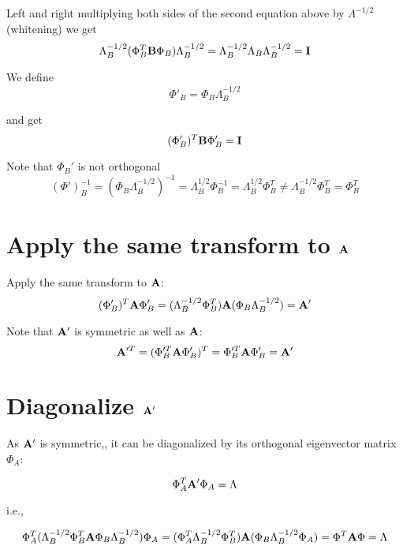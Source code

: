 \documentclass[11pt,letterpaper]{article}
\begin{document}
Left and right multiplying both sides of the second equation above by  $\Lambda^{-1/2}$ (whitening) we get 
\begin{equation}
\Lambda^{-1/2}_B (\Phi_B^T{\bf B}\Phi_B)\Lambda_B^{-1/2}      =    \Lambda^{-1/2}_B    \Lambda_B\Lambda^{-1/2}_B={\bf I}
\end{equation}

\noindent We define 
\begin{equation}
\Phi'_B=\Phi_B\Lambda^{-1/2}_B
\end{equation}

\noindent and get 
\begin{equation}
(\Phi'_B)^T{\bf B}\Phi'_B={\bf I}
\end{equation}

\noindent Note that $\Phi_B'$ is not orthogonal 
\begin{equation}
(\Phi')^{-1}_B=(\Phi_B\Lambda^{-1/2}_B)^{-1} = \Lambda_B^{1/2}\Phi_B^{-1}  = \Lambda_B^{1/2}\Phi_B^{T} \ne \Lambda^{-1/2}_B\Phi^T_B=\Phi^T_B
\end{equation}

\section{Apply the same transform to ${\bf A}$}
Apply the same transform to ${\bf A}$: 
\begin{equation}
(\Phi'_B)^T{\bf A}\Phi'_B =(\Lambda^{-1/2}_B \Phi_B^T){\bf A}(\Phi_B\Lambda^{-1/2}_B) ={\bf A}'
\end{equation}

\noindent Note that ${\bf A}'$ is symmetric as well as ${\bf A}$: 
\begin{equation}
{\bf A}'^T = (\Phi_B'^T {\bf A} \Phi_B')^T =\Phi_B'^T{\bf A}\Phi'_B={\bf A}' 
\end{equation}

\section{Diagonalize ${\bf A}'$}
As ${\bf A}'$ is symmetric,, it can be diagonalized by its orthogonal eigenvector matrix $\Phi_A$: 

\begin{equation}
\Phi_A^T{\bf A}'\Phi_A=\Lambda
\end{equation}

\noindent i.e., 

\begin{equation}
\Phi_A^T (\Lambda^{-1/2}_B\Phi_B^T{\bf A}\Phi_B\Lambda^{-1/2}_B)\Phi_A	 = (\Phi_A^T \Lambda^{-1/2}_B\Phi_B^T){\bf A}( \Phi_B\Lambda^{-1/2}_B \Phi_A) = \Phi^T {\bf A}\Phi =\Lambda
\end{equation}
\end{document}
